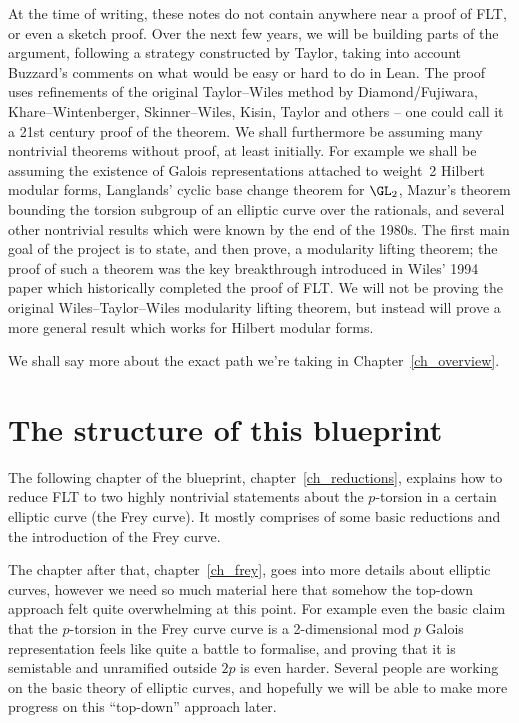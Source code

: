 At the time of writing, these notes do not contain anywhere near a proof of FLT, or even a sketch proof.
Over the next few years, we will be building parts of the argument, following a strategy
constructed by Taylor, taking into account Buzzard's comments on what would be easy or hard to do
in Lean. The proof uses refinements of the original Taylor--Wiles method by Diamond/Fujiwara,
Khare--Wintenberger, Skinner--Wiles, Kisin, Taylor and others -- one could call it a 21st century
proof of the theorem. We shall furthermore be assuming many nontrivial theorems without proof,
at least initially. For example we shall be assuming the existence of Galois representations
attached to weight~2 Hilbert modular forms, Langlands' cyclic base change theorem for $\GL_2$,
Mazur's theorem bounding the torsion subgroup of an elliptic curve over the rationals, and
several other nontrivial results which were known by the end of the 1980s. The first main goal
of the project is to state, and then prove, a modularity lifting theorem; the proof of such a theorem
was the key breakthrough introduced in Wiles' 1994 paper which historically completed the proof
of FLT. We will not be proving the original Wiles--Taylor--Wiles modularity lifting theorem, but
instead will prove a more general result which works for Hilbert modular forms.

We shall say more about the exact path we're taking in
Chapter~\ref{ch_overview}.

\section{The structure of this blueprint}

The following chapter of the blueprint, chapter~\ref{ch_reductions}, explains how to reduce FLT
to two highly nontrivial statements about the $p$-torsion in a certain elliptic curve (the Frey curve).
It mostly comprises of some basic reductions and the introduction of the Frey curve.

The chapter after that, chapter~\ref{ch_frey}, goes into more details about elliptic curves,
however we need so much material here that somehow the top-down approach felt quite overwhelming
at this point. For example even the basic claim that the $p$-torsion in the Frey curve curve is
a 2-dimensional mod $p$ Galois representation feels like quite a battle to formalise,
and proving that it is semistable and unramified outside $2p$ is even harder.
Several people are working on the basic theory of elliptic curves, and hopefully
we will be able to make more progress on this ``top-down'' approach later.

